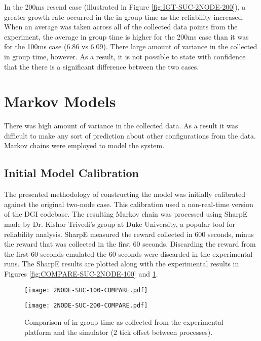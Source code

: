 In the 200ms resend case (illustrated in Figure \ref{fig:IGT-SUC-2NODE-200}), a greater growth rate occurred in the in group time as the reliability increased.
When an average was taken across all of the collected data points from the experiment, the average in group time is higher for the 200ms case than it was for the 100ms case (6.86 vs 6.09).
There large amount of variance in the collected in group time, however.
As a result, it is not possible to state with confidence that the there is a significant difference between the two cases.

\section{Markov Models}

There was high amount of variance in the collected data.
As a result it was difficult to make any sort of prediction about other configurations from the data.
Markov chains were employed to model the system.

\subsection{Initial Model Calibration}

The presented methodology of constructing the model was initially calibrated against the original two-node case.
This calibration used a non-real-time version of the DGI codebase.
The resulting Markov chain was processed using SharpE \cite{SHARPE}\cite{SHARPE2} made by Dr. Kishor Trivedi's group at Duke University, a popular tool for reliability analysis.
SharpE measured the reward collected in 600 seconds, minus the reward that was collected in the first 60 seconds. 
Discarding the reward from the first 60 seconds emulated the 60 seconds were discarded in the experimental runs.
The SharpE results are plotted along with the experimental results in Figures \ref{fig:COMPARE-SUC-2NODE-100} and \ref{fig:COMPARE-SUC-2NODE-200}.

\begin{figure}
\centering
\begin{minipage}{0.45\textwidth}
    \centering
    \texttt{[image: 2NODE-SUC-100-COMPARE.pdf]}
    \caption{Comparison of in-group time as collected from the experimental platform and the simulator (1 tick offset between processes).}
    \label{fig:COMPARE-SUC-2NODE-100}
\end{minipage}%
\qquad
\begin{minipage}{0.45\textwidth}
    \centering
    \texttt{[image: 2NODE-SUC-200-COMPARE.pdf]}
    \caption{Comparison of in-group time as collected from the experimental platform and the simulator (2 tick offset between processes).}
    \label{fig:COMPARE-SUC-2NODE-200}
\end{minipage}
\end{figure}

